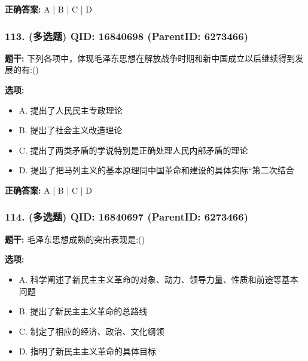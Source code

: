 \documentclass[12pt,UTF8]{ctexart}
\begin{document}
\textbf{正确答案:}
A | B | C | D

\vspace{0.3em}\hrulefill\vspace{0.7em}

\subsubsection*{113. (多选题) \small QID: 16840698 (ParentID: 6273466)}

\textbf{题干:}
下列各项中，体现毛泽东思想在解放战争时期和新中国成立以后继续得到发展的有:()



\textbf{选项:}
\begin{itemize}[leftmargin=*]

  \item A. 提出了人民民主专政理论

  \item B. 提出了社会主义改造理论

  \item C. 提出了两类矛盾的学说特别是正确处理人民内部矛盾的理论

  \item D. 提出了把马列主义的基本原理同中国革命和建设的具体实际“第二次结合

\end{itemize}

\textbf{正确答案:}
A | B | C | D

\vspace{0.3em}\hrulefill\vspace{0.7em}

\subsubsection*{114. (多选题) \small QID: 16840697 (ParentID: 6273466)}

\textbf{题干:}
毛泽东思想成熟的突出表现是:()



\textbf{选项:}
\begin{itemize}[leftmargin=*]

  \item A. 科学阐述了新民主主义革命的对象、动力、领导力量、性质和前途等基本问题

  \item B. 提出了新民主主义革命的总路线

  \item C. 制定了相应的经济、政治、文化纲领

  \item D. 指明了新民主主义革命的具体目标

\end{itemize}
\end{document}

